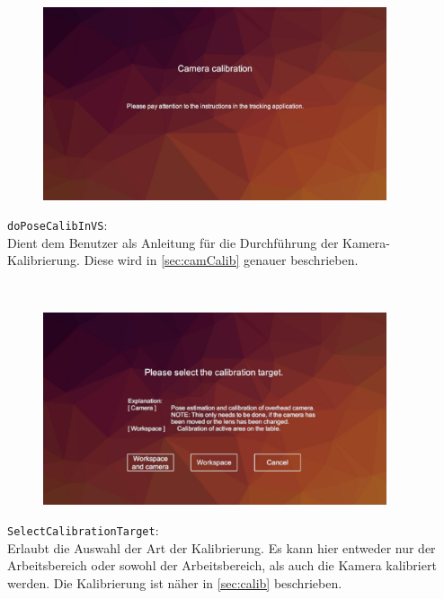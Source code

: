 \begin{minipage}{0.6\textwidth}
	\begin{figure}[H] 
		\includegraphics[trim=3cm 2cm 3cm 2cm, clip, width=0.9\textwidth]{Bilder/doPoseCalibInVS.jpg}
			\label{fig:doPoseCalibInVS}
	\end{figure}
\end{minipage}
\begin{minipage}{0.4\textwidth}
	\texttt{doPoseCalibInVS}:\\
	Dient dem Benutzer als Anleitung für die Durchführung der Kamera-Kalibrierung. Diese wird in \ref{sec:camCalib} genauer beschrieben.
\end{minipage}\\

\begin{minipage}{0.6\textwidth}
	\begin{figure}[H] 
		\includegraphics[trim=3cm 1cm 3cm 3cm, clip, width=0.9\textwidth]{Bilder/SelectCalibrationTarget.jpg}
			\label{fig:SelectCalibrationTarget}
	\end{figure}
\end{minipage}
\begin{minipage}{0.4\textwidth}
	\texttt{SelectCalibrationTarget}:\\
	Erlaubt die Auswahl der Art der Kalibrierung. Es kann hier entweder nur der Arbeitsbereich oder sowohl der Arbeitsbereich, als auch die Kamera kalibriert werden. Die Kalibrierung ist näher in \ref{sec:calib} beschrieben.
\end{minipage}\\

